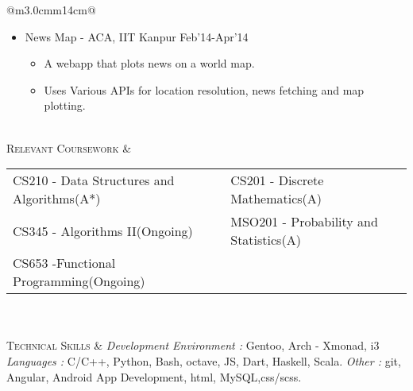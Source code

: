 \documentclass[a4paper]{article}
\begin{document}
\begin{longtable}{@{}m{3.0cm}m{14cm}@{}}
\begin{itemize}
\begin{itemize}
                                 \item Uses Delaunay Triangulation so that image is aesthetically pleasing.
                                 \item Uses OpenCV for Image Processing and Manipulation.
                                 \end{itemize}
                               \item
                                 News Map - {\footnotesize ACA, IIT Kanpur }                               \hfill Feb'14-Apr'14
                                 \vspace{-2mm}\begin{itemize} \itemsep -2pt
                                 \item A webapp that plots news on a world map.
                                 \item Uses Various APIs for location resolution, news fetching and map plotting.
                                 \end{itemize}
                               \end{itemize}

\\

   \textrm{\textsc{Relevant Coursework}} &  
                                        \begin{tabular}{p{69mm} p{60mm}} 
                                          CS210 - Data Structures and Algorithms(A*) & CS201 - Discrete Mathematics(A)  \\
                                          CS345 - Algorithms II(Ongoing)             & MSO201 - Probability and Statistics(A) \\
                                          CS653 -Functional Programming(Ongoing) \\
                                        \end{tabular}

\\\\ 

  \textrm{\textsc{Technical Skills}} & 
                                       {\sl Development Environment :} Gentoo,
                                       Arch - Xmonad, i3 \newline
                                       {\sl Languages :} C/C++, Python, Bash, octave, JS, Dart, Haskell, Scala.\newline
                                       {\sl Other :} git, Angular, Android App
                                       Development, html, MySQL,css/scss.


\end{longtable}
\end{document}
